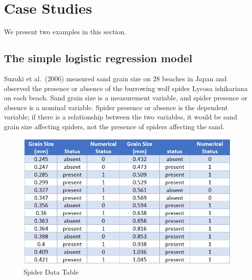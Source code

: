 \documentclass[
]{book}
\begin{document}
\hypertarget{case-studies-1}{%
\section{Case Studies}\label{case-studies-1}}

We present two examples in this section.

\hypertarget{the-simple-logistic-regression-model}{%
\subsection{The simple logistic regression model}\label{the-simple-logistic-regression-model}}

Suzuki et al.~(2006) measured sand grain size on 28 beaches in Japan and observed the presence or absence of the burrowing wolf spider Lycosa ishikariana on each beach. Sand grain size is a measurement variable, and spider presence or absence is a nominal variable. Spider presence or absence is the dependent variable; if there is a relationship between the two variables, it would be sand grain size affecting spiders, not the presence of spiders affecting the sand.

\begin{figure}

{\centering \includegraphics[width=0.8\linewidth]{img11/w11-SpiderDataTable} 

}

\caption{Spider Data Table}\label{fig:unnamed-chunk-177}
\end{figure}
\end{document}
